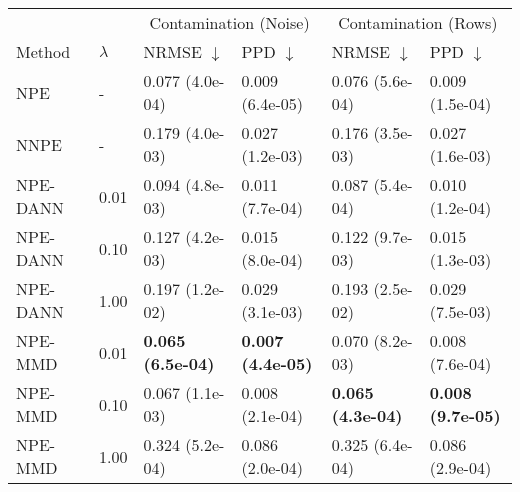     \begin{tabular}{ ll |ll|ll}
     \toprule
            &           & \multicolumn{2}{c}{Contamination (Noise)} & \multicolumn{2}{c}{Contamination (Rows)} \\
     Method & $\lambda$ & NRMSE $\downarrow$ & PPD $\downarrow$ & NRMSE $\downarrow$ & PPD $\downarrow$  \\
     \midrule
NPE & - & \cellcolor{lime!95} 0.077 (4.0e-04) & \cellcolor{lime!98} 0.009 (6.4e-05) & \cellcolor{lime!95} 0.076 (5.6e-04) & \cellcolor{lime!98} 0.009 (1.5e-04) \vspace{0.1cm}\\
NNPE & - & \cellcolor{lime!55} 0.179 (4.0e-03) & \cellcolor{lime!74} 0.027 (1.2e-03) & \cellcolor{lime!57} 0.176 (3.5e-03) & \cellcolor{lime!74} 0.027 (1.6e-03) \vspace{0.1cm}\\
NPE-DANN & 0.01 & \cellcolor{lime!88} 0.094 (4.8e-03) & \cellcolor{lime!95} 0.011 (7.7e-04) & \cellcolor{lime!91} 0.087 (5.4e-04) & \cellcolor{lime!96} 0.010 (1.2e-04) \\
NPE-DANN & 0.10 & \cellcolor{lime!75} 0.127 (4.2e-03) & \cellcolor{lime!89} 0.015 (8.0e-04) & \cellcolor{lime!78} 0.122 (9.7e-03) & \cellcolor{lime!90} 0.015 (1.3e-03) \\
NPE-DANN & 1.00 & \cellcolor{lime!48} 0.197 (1.2e-02) & \cellcolor{lime!72} 0.029 (3.1e-03) & \cellcolor{lime!50} 0.193 (2.5e-02) & \cellcolor{lime!71} 0.029 (7.5e-03) \vspace{0.1cm}\\
NPE-MMD & 0.01 & \cellcolor{lime!100} \textbf{0.065 (6.5e-04)} & \cellcolor{lime!100} \textbf{0.007 (4.4e-05)} & \cellcolor{lime!98} 0.070 (8.2e-03) & \cellcolor{lime!99} 0.008 (7.6e-04) \\
NPE-MMD & 0.10 & \cellcolor{lime!99} 0.067 (1.1e-03) & \cellcolor{lime!99} 0.008 (2.1e-04) & \cellcolor{lime!100} \textbf{0.065 (4.3e-04)} & \cellcolor{lime!100} \textbf{0.008 (9.7e-05)} \\
NPE-MMD & 1.00 & \cellcolor{lime!0} 0.324 (5.2e-04) & \cellcolor{lime!0} 0.086 (2.0e-04) & \cellcolor{lime!0} 0.325 (6.4e-04) & \cellcolor{lime!0} 0.086 (2.9e-04) \vspace{0.1cm}\\

     \hline
    \end{tabular}
